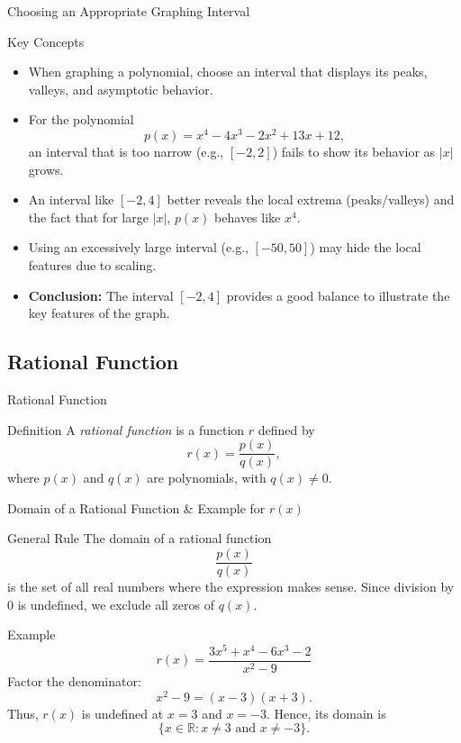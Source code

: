 \begin{frame}{Choosing an Appropriate Graphing Interval}
  \begin{block}{Key Concepts}
    \begin{itemize}
      \item When graphing a polynomial, choose an interval that displays its peaks, valleys, and asymptotic behavior.
      \item For the polynomial
      \[
        p(x)=x^4-4x^3-2x^2+13x+12,
      \]
      an interval that is too narrow (e.g., \([-2,2]\)) fails to show its behavior as \(|x|\) grows.
      \item An interval like \([-2,4]\) better reveals the local extrema (peaks/valleys) and the fact that for large \(|x|\), \(p(x)\) behaves like \(x^4\).
      \item Using an excessively large interval (e.g., \([-50,50]\)) may hide the local features due to scaling.
      \item \textbf{Conclusion:} The interval \([-2,4]\) provides a good balance to illustrate the key features of the graph.
    \end{itemize}
  \end{block}
\end{frame}

\subsection{Rational Function}
\begin{frame}{Rational Function}
  \begin{block}{Definition}
    A \emph{rational function} is a function \(r\) defined by
    \[
      r(x) = \frac{p(x)}{q(x)},
    \]
    where \(p(x)\) and \(q(x)\) are polynomials, with \(q(x) \neq 0\).
  \end{block}
\end{frame}

\begin{frame}{Domain of a Rational Function \& Example for \(r(x)\)}
  \begin{block}{General Rule}
    The domain of a rational function 
    \[
      \frac{p(x)}{q(x)}
    \]
    is the set of all real numbers where the expression makes sense. Since division by 0 is undefined, we exclude all zeros of \(q(x)\).
  \end{block}
\end{frame}

\begin{frame}
  \begin{exampleblock}{Example }
    \[r(x)=\frac{3x^5+x^4-6x^3-2}{x^2-9}\]
    Factor the denominator:
    \[
      x^2-9=(x-3)(x+3).
    \]
    Thus, \(r(x)\) is undefined at \(x=3\) and \(x=-3\). Hence, its domain is
    \[
      \{x\in\mathbb{R}: x\neq 3 \text{ and } x\neq -3\}.
    \]
  \end{exampleblock}
\end{frame}


